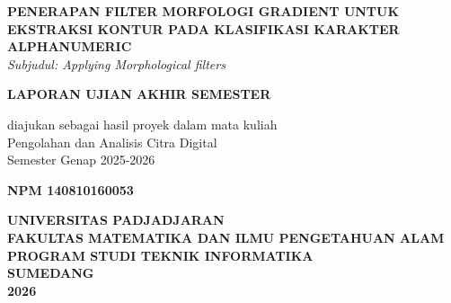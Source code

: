 \documentclass[12pt,a4paper]{article}
\begin{document}
\begin{titlepage}
    \centering
    \vspace*{1cm}
    
    {\large\bfseries PENERAPAN FILTER MORFOLOGI GRADIENT UNTUK EKSTRAKSI KONTUR PADA KLASIFIKASI KARAKTER ALPHANUMERIC \\}
    \vspace{0.3cm}
    {\large\itshape Subjudul: Applying Morphological filters \\}
    
    \vspace{2.5cm}
    
    {\large\bfseries LAPORAN UJIAN AKHIR SEMESTER\\}
    
    \vspace{1.5cm}
    
    {\large diajukan sebagai hasil proyek dalam mata kuliah\\
    Pengolahan dan Analisis Citra Digital\\
    Semester Genap 2025-2026\\}
    
    \vspace{2.5cm}
    
    {\large\bfseries NPM 140810160053\\}
    
    \vfill
    
    \vspace{2cm}
    
    {\large\bfseries UNIVERSITAS PADJADJARAN\\
    FAKULTAS MATEMATIKA DAN ILMU PENGETAHUAN ALAM\\
    PROGRAM STUDI TEKNIK INFORMATIKA\\
    SUMEDANG\\
    2026\\}
    
    \vspace{1cm}
\end{titlepage}

\newpage
{}

\end{document}
